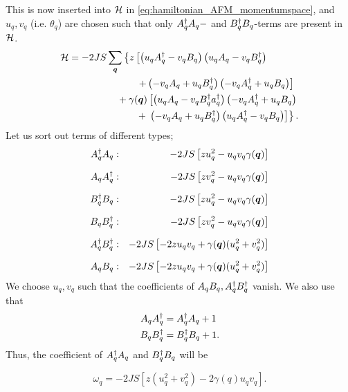 This is now inserted into $\mathcal{H}$ in \cref{eq:hamiltonian_AFM_momentumspace}, and $u_{q},v_{q}$ (i.e. $\theta_{q}$) are chosen such that only $A_{q}^{\dagger}A_{q}-$ and $B_{q}^{\dagger}B_{q}$-terms are present in $\mathcal{H}$.
\begin{align*}
	\mathcal{H} &= -2JS\sum_{\bm{q}}\left \{z\left [\left (u_{q}A_{q}^{\dagger}-v_{q}B_{q}\right )\left (u_{q}A_{q}-v_{q}B_{q}^{\dagger}\right )\right .\right. \\
	&\qquad\qquad\qquad\quad \left . + \left (-v_{q}A_{q} + u_{q}B_{q}^{\dagger}\right )\left ( -v_{q}A_{q}^{\dagger} + u_{q}B_{q}\right )\right ] \\
	&\qquad\qquad\quad +\gamma(\bm{q})\left [\left (u_{q}A_{q}-v_{q}B_{q}^{\dagger}  a_{q}^{\dagger}\right )\left (-v_{q}A_{q}^{\dagger} + u_{q}B_{q}\right )\right .\\
	&\qquad\qquad\qquad\quad + \left .\left .\left (-v_{q}A_{q} + u_{q}B_{q}^{\dagger}\right )\left (u_{q}A_{q}^{\dagger}-v_{q}B_{q}\right ) \right ]\right \}.
\end{align*}
Let us sort out terms of different types;
\begin{align*}
	A_{q}^{\dagger}A_{q}: &&-2JS\left [zu_{q}^2 - u_{q}v_{q}\gamma(\bm{q})\right ] \\[1.5ex]
	A_{q}A_{q}^{\dagger}: && -2JS\left [zv_{q}^2 - u_{q}v_{q}\gamma(\bm{q})\right ] \\[1.5ex]
	B_{q}^{\dagger}B_{q}: && -2JS\left [zu_{q}^2 - u_{q}v_{q}\gamma(\bm{q})\right ] \\[1.5ex]
	B_{q}B_{q}^{\dagger}: && -2JS\left [zv_{q}^2 - u_{q}v_{q}\gamma(\bm{q})\right ] \\[1.5ex]
	A_{q}^{\dagger}B_{q}^{\dagger}: && -2JS\left [-2zu_{q}v_{q} + \gamma(\bm{q})(u_{q}^2  + v_{q}^2)\right ]\\[1.5ex]
	A_{q}B_{q}: && -2JS\left [-2zu_{q}v_{q} + \gamma(\bm{q})(u_{q}^2  + v_{q}^2)\right ]
\end{align*}
We choose $u_{q}, v_{q}$ such that the coefficients of $A_{q}B_{q}, A_{q}^{\dagger}B_{q}^{\dagger}$ vanish. We also use that 
\begin{align}
	A_{q}A_{q}^{\dagger} &= A_{q}^{\dagger}A_{q} + 1 \\
	B_{q}B_{q}^{\dagger} &= B_{q}^{\dagger}B_{q} + 1.
\end{align}
Thus, the coefficient of $A_{q}^{\dagger}A_{q}$ and $B_{q}^{\dagger}B_{q}$ will be
\begin{tcolorbox}
	\begin{equation}
		\omega_q = -2JS\left [z(u_{q}^2 + v_{q}^2)-2\gamma(q)u_{q}v_{q}\right ].
	\end{equation}                         
\end{tcolorbox}
